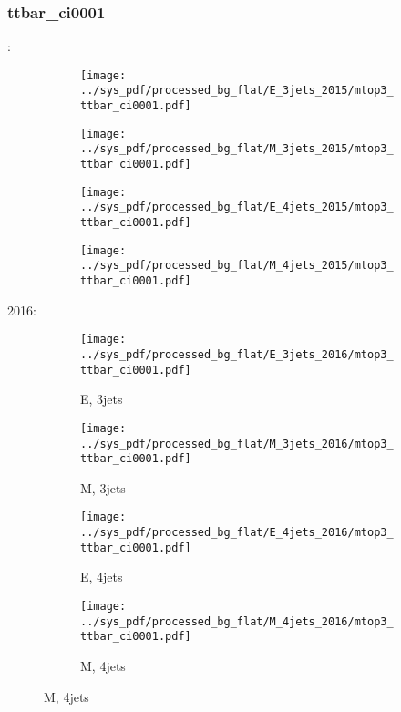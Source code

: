 \documentclass{beamer}
\begin{document}
\begin{frame}
\frametitle{ttbar_ci0001}
\fontsize{5}{1}:
\begin{figure}
\centering
\begin{subfigure}[b]{0.24\textwidth}
\texttt{[image: ../sys\_pdf/processed\_bg\_flat/E\_3jets\_2015/mtop3\_ttbar\_ci0001.pdf]}
\end{subfigure}
\begin{subfigure}[b]{0.24\textwidth}
\texttt{[image: ../sys\_pdf/processed\_bg\_flat/M\_3jets\_2015/mtop3\_ttbar\_ci0001.pdf]}
\end{subfigure}
\begin{subfigure}[b]{0.24\textwidth}
\texttt{[image: ../sys\_pdf/processed\_bg\_flat/E\_4jets\_2015/mtop3\_ttbar\_ci0001.pdf]}
\end{subfigure}
\begin{subfigure}[b]{0.24\textwidth}
\texttt{[image: ../sys\_pdf/processed\_bg\_flat/M\_4jets\_2015/mtop3\_ttbar\_ci0001.pdf]}
\end{subfigure}
\end{figure}
2016:
\begin{figure}
\centering
\begin{subfigure}[b]{0.24\textwidth}
\texttt{[image: ../sys\_pdf/processed\_bg\_flat/E\_3jets\_2016/mtop3\_ttbar\_ci0001.pdf]}
\captionsetup{font=tiny}
\caption{E, 3jets}
\end{subfigure}
\begin{subfigure}[b]{0.24\textwidth}
\texttt{[image: ../sys\_pdf/processed\_bg\_flat/M\_3jets\_2016/mtop3\_ttbar\_ci0001.pdf]}
\captionsetup{font=tiny}
\caption{M, 3jets}
\end{subfigure}
\begin{subfigure}[b]{0.24\textwidth}
\texttt{[image: ../sys\_pdf/processed\_bg\_flat/E\_4jets\_2016/mtop3\_ttbar\_ci0001.pdf]}
\captionsetup{font=tiny}
\caption{E, 4jets}
\end{subfigure}
\begin{subfigure}[b]{0.24\textwidth}
\texttt{[image: ../sys\_pdf/processed\_bg\_flat/M\_4jets\_2016/mtop3\_ttbar\_ci0001.pdf]}
\captionsetup{font=tiny}
\caption{M, 4jets}
\end{subfigure}
\end{figure}
\end{frame}
\end{document}
